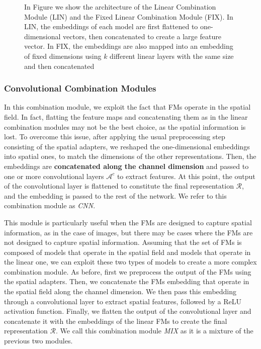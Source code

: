 \begin{figure}[ht]
    \caption{In Figure we show the architecture of the Linear Combination Module (LIN) and the Fixed Linear Combination Module (FIX). In LIN, the embeddings of each model are first flattened to one-dimensional vectors, then concatenated to create a large feature vector. In FIX, the embeddings are also mapped into an embedding of fixed dimensions using $k$ different linear layers with the same size and then concatenated}
    \label{fig:lin_combination}
\end{figure}




\subsubsection{Convolutional Combination Modules}
\label{subsubsec:convolutional_combination}
In this combination module, we exploit the fact that FMs operate in the spatial field.
In fact, flatting the feature maps and concatenating them as in the linear combination modules may not be the best choice, as the spatial information is lost.
To overcome this issue, after applying the usual preprocessing step consisting of the spatial adapters, we reshaped the one-dimensional embeddings into spatial ones, to match the dimensions of the other representations.
Then, the embeddings are \textbf{concatenated along the channel dimension} and passed to one or more convolutional layers $\mathcal{A}^c$ to extract features.
At this point, the output of the convolutional layer is flattened to constitute the final representation $\mathcal{R}$, and the embedding is passed to the rest of the network.
We refer to this combination module as \textit{CNN}.

This module is particularly useful when the FMs are designed to capture spatial information, as in the case of images, but there may be cases where the FMs are not designed to capture spatial information.
Assuming that the set of FMs is composed of models that operate in the spatial field and models that operate in the linear one, we can exploit these two types of models to create a more complex combination module.
As before, first we preprocess the output of the FMs using the spatial adapters.
Then, we concatenate the FMs embedding that operate in the spatial field along the channel dimension.
We then pass this embedding through a convolutional layer to extract spatial features, followed by a ReLU activation function.
Finally, we flatten the output of the convolutional layer and concatenate it with the embeddings of the linear FMs to create the final representation $\mathcal{R}$.
We call this combination module \textit{MIX} as it is a mixture of the previous two modules.

